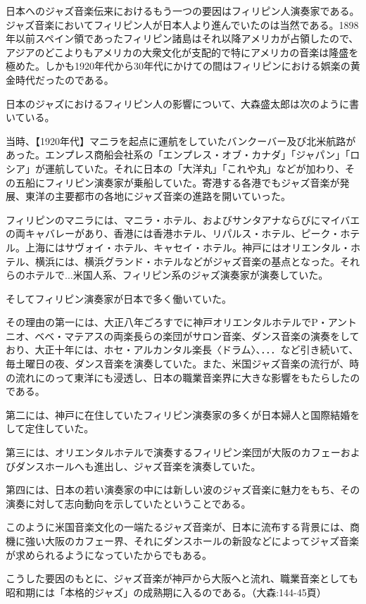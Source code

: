 日本へのジャズ音楽伝来におけるもう一つの要因はフィリピン人演奏家である。ジャズ音楽においてフィリピン人が日本人より進んでいたのは当然である。1898年以前スペイン領であったフィリピン諸島はそれ以降アメリカが占領したので、アジアのどこよりもアメリカの大衆文化が支配的で特にアメリカの音楽は隆盛を極めた。しかも1920年代から30年代にかけての間はフィリピンにおける娯楽の黄金時代だったのである。

日本のジャズにおけるフィリピン人の影響について、大森盛太郎は次のように書いている。

当時、【1920年代】マニラを起点に運航をしていたバンクーバー及び北米航路があった。エンプレス商船会社系の「エンプレス・オブ・カナダ」「ジャパン」「ロシア」が運航していた。それに日本の「大洋丸」「これや丸」などが加わり、その五船にフィリピン演奏家が乗船していた。寄港する各港でもジャズ音楽が発展、東洋の主要都市の各地にジャズ音楽の進路を開いていった。

フィリピンのマニラには、マニラ・ホテル、およびサンタアナならびにマイバエの両キャバレーがあり、香港には香港ホテル、リパルス・ホテル、ピーク・ホテル。上海にはサヴォイ・ホテル、キャセイ・ホテル。神戸にはオリエンタル・ホテル、横浜には、横浜グランド・ホテルなどがジャズ音楽の基点となった。それらのホテルで...米国人系、フィリピン系のジャズ演奏家が演奏していた。

そしてフィリピン演奏家が日本で多く働いていた。

その理由の第一には、大正八年ごろすでに神戸オリエンタルホテルでP・アントニオ、ベベ・マテアスの両楽長らの楽団がサロン音楽、ダンス音楽の演奏をしており、大正十年には、ホセ・アルカンタル楽長〈ドラム〉、．．．など引き続いて、毎土曜日の夜、ダンス音楽を演奏していた。また、米国ジャズ音楽の流行が、時の流れにのって東洋にも浸透し、日本の職業音楽界に大きな影響をもたらしたのである。

第二には、神戸に在住していたフィリピン演奏家の多くが日本婦人と国際結婚をして定住していた。

第三には、オリエンタルホテルで演奏するフィリピン楽団が大阪のカフェーおよびダンスホールへも進出し、ジャズ音楽を演奏していた。

第四には、日本の若い演奏家の中には新しい波のジャズ音楽に魅力をもち、その演奏に対して志向動向を示していたということである。

このように米国音楽文化の一端たるジャズ音楽が、日本に流布する背景には、商機に強い大阪のカフェー界、それにダンスホールの新設などによってジャズ音楽が求められるようになっていたからでもある。

こうした要因のもとに、ジャズ音楽が神戸から大阪へと流れ、職業音楽としても昭和期には「本格的ジャズ」の成熟期に入るのである。（大森:144-45頁）

